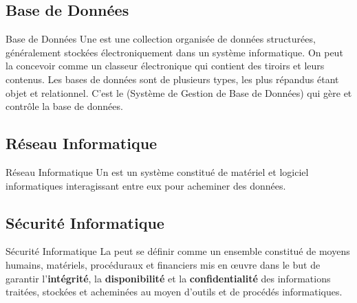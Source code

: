 \subsection{Base de Données}

\begin{boxdef}{Base de Données}
Une  est une collection organisée de données structurées,
généralement stockées électroniquement dans un système informatique. On peut la
concevoir comme un classeur électronique qui contient des tiroirs et leurs contenus.
Les bases de données sont de plusieurs types, les plus répandus étant objet et
relationnel. C'est le  (Système de Gestion de Base de Données) qui gère
et contrôle la base de données.
\end{boxdef}

\subsection{Réseau Informatique}

\begin{boxdef}{Réseau Informatique}
Un  est un système constitué de matériel et logiciel
informatiques interagissant entre eux pour acheminer des données.
\end{boxdef}

\subsection{Sécurité Informatique}

\begin{boxdef}{Sécurité Informatique}
La  peut se définir comme un ensemble constitué de
moyens humains, matériels, procéduraux et financiers mis en œuvre dans le but de
garantir l'\textbf{intégrité}, la \textbf{disponibilité} et la \textbf{confidentialité}
des informations traitées, stockées et acheminées au moyen d'outils et de procédés
informatiques.
\end{boxdef}

